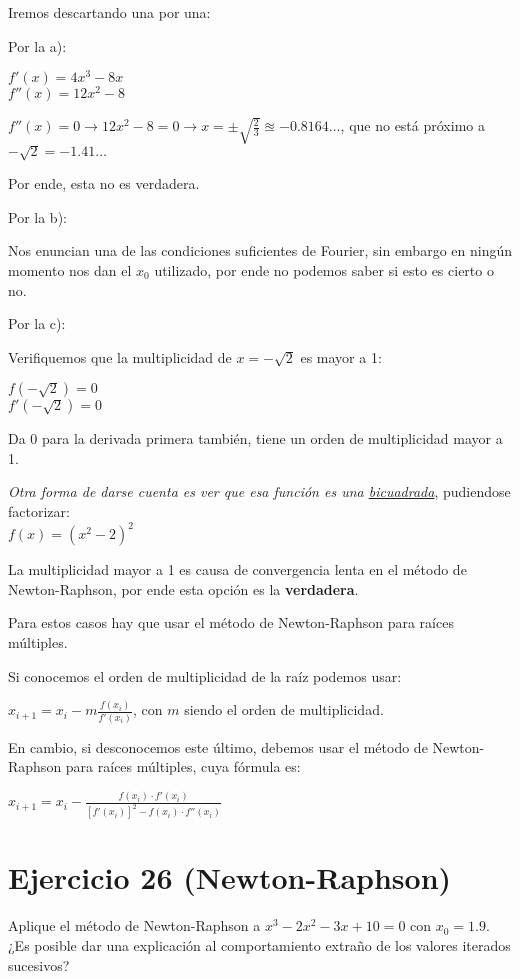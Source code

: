 \documentclass[11pt]{article}
\begin{document}
	Iremos descartando una por una:
	
	Por la a):
	
	$f'(x)=4x^3-8x$\\
	$f''(x)=12x^2-8$
	
	$f''(x)=0 \rightarrow 12x^2-8=0 \rightarrow x=\pm \sqrt{\frac{2}{3}}\approxeq-0.8164\dots$, que no está próximo a $-\sqrt{2}=-1.41 \dots$
	
	Por ende, esta no es verdadera.
	
	Por la b):
	
	Nos enuncian una de las condiciones suficientes de Fourier, sin embargo en ningún momento nos dan el $x_0$ utilizado, por ende no podemos saber si esto es cierto o no.
	
	Por la c):
	
	Verifiquemos que la multiplicidad de $x=-\sqrt{2}$ es mayor a 1:
	
	$f(-\sqrt{2})=0$\\
	$f'(-\sqrt{2})=0$
	
	Da 0 para la derivada primera también, tiene un orden de multiplicidad mayor a 1.
	
	\textit{Otra forma de darse cuenta es ver que esa función es una \underline{bicuadrada}}, pudiendose factorizar:\\ $f(x)=(x^2-2)^2$
	
	La multiplicidad mayor a 1 es causa de convergencia lenta en el método de Newton-Raphson, por ende esta opción es la \textbf{verdadera}.
	
	Para estos casos hay que usar el método de Newton-Raphson para raíces múltiples.
	
	Si conocemos el orden de multiplicidad de la raíz podemos usar:
	
	$\displaystyle x_{i+1}=x_i-m\frac{f(x_i)}{f'(x_i)}$, con $m$ siendo el orden de multiplicidad.
	
	En cambio, si desconocemos este último, debemos usar el método de Newton-Raphson para raíces múltiples, cuya fórmula es:
	
	$\displaystyle x_{i+1}=x_i-\frac{f(x_i)\cdot f'(x_i)}{[f'(x_i)]^2-f(x_i)\cdot f''(x_i)}$
	
	\section{Ejercicio 26 (Newton-Raphson)}
	Aplique el método de Newton-Raphson a $x^3-2x^2-3x+10=0$ con $x_0=1.9$. ¿Es posible dar una explicación al comportamiento extraño de los valores iterados sucesivos?
	
\end{document}

